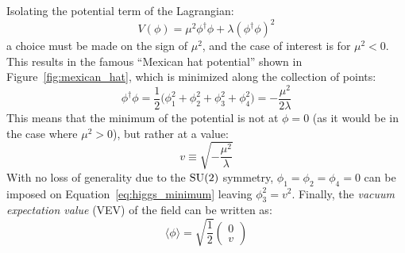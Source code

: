 Isolating the potential term of the Lagrangian:
\begin{equation}
  V(\phi) = \mu^2\phi^{\dagger}\phi+\lambda(\phi^{\dagger}\phi)^2
  \label{eq:higgs_potential}
\end{equation}
a choice must be made on the sign of $\mu^2$, and the case of interest is for $\mu^2 < 0$. %
This results in the famous ``Mexican hat potential'' shown in Figure~\ref{fig:mexican_hat}, which is minimized along the collection of points:
\begin{equation}
  \phi^{\dagger}\phi = \frac{1}{2}\big(\phi_1^2 + \phi_2^2 + \phi_3^2 + \phi_4^2\big) = -\frac{\mu^2}{2\lambda}
  \label{eq:higgs_minimum}
\end{equation}
This means that the minimum of the potential is not at $\phi = 0$ (as it would be in the case where $\mu^2 > 0$), but rather at a value:
\begin{equation}
  v \equiv \sqrt{-\frac{\mu^2}{\lambda}}
  \label{eq:higgs_minimum_value}
\end{equation}
With no loss of generality due to the $\textrm{SU}(2)$ symmetry, $\phi_1 = \phi_2 = \phi_4 = 0$ can be imposed on Equation~\ref{eq:higgs_minimum} leaving $\phi_3^2 = v^2$.
Finally, the \emph{vacuum expectation value} (VEV) of the field can be written as:
\begin{equation}
  \langle\phi\rangle = \sqrt{\frac{1}{2}}
  \begin{pmatrix}
  0 \\ v
  \end{pmatrix}
  \label{eq:vev}
\end{equation}

